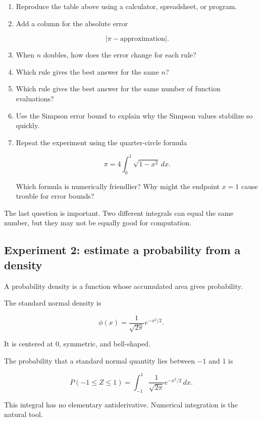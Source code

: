 \begin{enumerate}
\item Reproduce the table above using a calculator, spreadsheet, or program.

\item Add a column for the absolute error

\[
|\pi-\text{approximation}|.
\]

\item When \(n\) doubles, how does the error change for each rule?

\item Which rule gives the best answer for the same \(n\)?

\item Which rule gives the best answer for the same number of function evaluations?

\item Use the Simpson error bound to explain why the Simpson values stabilize so
quickly.

\item Repeat the experiment using the quarter-circle formula

\[
\pi=4\int_0^1 \sqrt{1-x^2}\,dx.
\]

Which formula is numerically friendlier?  Why might the endpoint \(x=1\) cause
trouble for error bounds?
\end{enumerate}

The last question is important.  Two different integrals can equal the same number, but
they may not be equally good for computation.

\subsection{Experiment 2: estimate a probability from a density}
\label{subsec:experiment-probability-density}

A probability density is a function whose accumulated area gives probability.

The standard normal density is

\[
\phi(x)=\frac{1}{\sqrt{2\pi}}e^{-x^2/2}.
\]

It is centered at \(0\), symmetric, and bell-shaped.

The probability that a standard normal quantity lies between \(-1\) and \(1\) is

\[
P(-1\le Z\le1)
=
\int_{-1}^{1}
\frac{1}{\sqrt{2\pi}}e^{-x^2/2}\,dx.
\]

This integral has no elementary antiderivative.  Numerical integration is the natural
tool.


